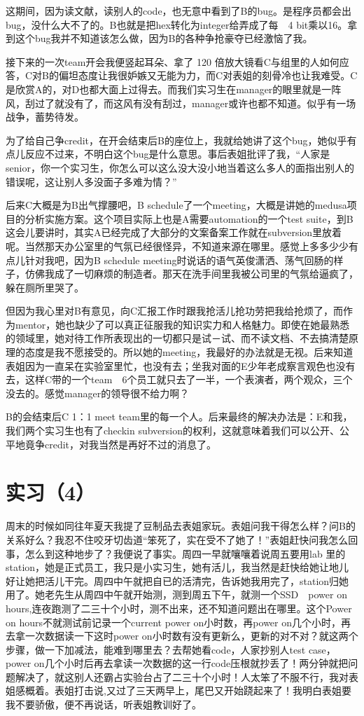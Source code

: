 \documentclass[12pt]{book}
\begin{document}
这期间，因为读文献，读别人的code，也无意中看到了B的bug。是程序员都会出bug，没什么大不了的。B也就是把hex转化为integer给弄成了每　4 bit乘以16。拿到这个bug我并不知道该怎么做，因为B的各种争抢豪夺已经激恼了我。

接下来的一次team开会我便竖起耳朵、拿了 120 倍放大镜看C与组里的人如何应答，C对B的偏坦态度让我很妒嫉又无能为力，而C对表姐的刻骨冷也让我难受。C是欣赏A的，对D也都大面上过得去。而我们实习生在manager的眼里就是一阵风，刮过了就没有了，而这风有没有刮过，manager或许也都不知道。似乎有一场战争，蓄势待发。

为了给自己争credit，在开会结束后B的座位上，我就给她讲了这个bug，她似乎有点儿反应不过来，不明白这个bug是什么意思。事后表姐批评了我，“人家是senior，你一个实习生，你怎么可以这么没大没小地当着这么多人的面指出别人的错误呢，这让别人多没面子多难为情？”

后来C大概是为B出气撑腰吧，B schedule了一个meeting，大概是讲她的medusa项目的分析实施方案。这个项目实际上也是A需要automation的一个test suite，到B这会儿要讲时，其实A已经完成了大部分的文案备案工作就在subversion里放着呢。当然那天办公室里的气氛已经很怪异，不知道来源在哪里。感觉上多多少少有点儿针对我吧，因为B schedule meeting时说话的语气英俊潇洒、荡气回肠的样子，仿佛我成了一切麻烦的制造者。那天在洗手间里我被公司里的气氛给逼疯了，躲在厕所里哭了。

但因为我心里对B有意见，向C汇报工作时跟我抢活儿抢功劳把我给抢烦了，而作为mentor，她也缺少了可以真正征服我的知识实力和人格魅力。即使在她最熟悉的领域里，她对待工作所表现出的一切都只是试－试、而不读文档、不去搞清楚原理的态度是我不愿接受的。所以她的meeting，我最好的办法就是无视。后来知道表姐因为一直呆在实验室里忙，也没有去；坐我对面的E少年老成察言观色也没有去，这样C带的一个team　6个员工就只去了一半，一个表演者，两个观众，三个没去的。感觉manager的领导很不给力啊？

B的会结束后C 1：1 meet team里的每一个人。后来最终的解决办法是：E和我，我们两个实习生也有了checkin subversion的权利，这就意味着我们可以公开、公平地竟争credit，对我当然是再好不过的消息了。

\section{实习（4）}
\label{sec-5-7}

周末的时候如同往年夏天我提了豆制品去表姐家玩。表姐问我干得怎么样？问B的关系好么？我忍不住咬牙切齿道“笨死了，实在受不了她了！”表姐赶快问我怎么回事，怎么到这种地步了？我便说了事实。周四一早就嚷嚷着说周五要用lab 里的station，她是正式员工，我只是小实习生，她有活儿，我当然是赶快给她让地儿好让她把活儿干完。周四中午就把自已的活清完，告诉她我用完了，station归她用了。她老先生从周四中午就开始测，测到周五下午，就测一个SSD　power on hours,连夜跑测了二三十个小时，测不出来，还不知道问题出在哪里。这个Power on hours不就测试前记录一个current power on小时数，再power on几个小时，再去拿一次数据读一下这时power on小时数有没有更新么，更新的对不对？就这两个步骤，做一下加减法，能难到哪里去？去帮她看code，人家抄别人test case，power on几个小时后再去拿读一次数据的这一行code压根就抄丢了！两分钟就把问题解决了，就这别人还霸占实验台占了二三十个小时！人太笨了不服不行，我对表姐感概着。表姐打击说,又过了三天两早上，尾巴又开始跷起来了！我明白表姐要我不要骄傲，便不再说话，听表姐教训好了。
\end{document}
